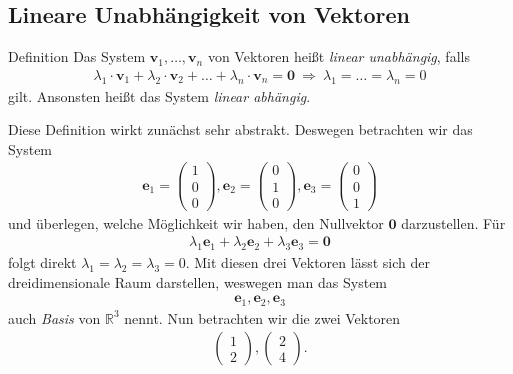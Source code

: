 \subsection{Lineare Unabhängigkeit von Vektoren}

\begin{mybox}{Definition}
Das System $\textbf{v}_1, \dots, \textbf{v}_n$ von Vektoren heißt \textit{linear unabhängig}, falls
\begin{align*}
\lambda_1 \cdot  \textbf{v}_1 + \lambda_2 \cdot \textbf{v}_2 + \dots + \lambda_n \cdot \textbf{v}_n = \textbf{0}
\ \Rightarrow \
\lambda_1 = \dots = \lambda_n = 0
\end{align*}
gilt.
Ansonsten heißt das System \textit{linear abhängig}.
\end{mybox}
Diese Definition wirkt zunächst sehr abstrakt.
Deswegen betrachten wir das System
\begin{align*}
\textbf{e}_1 =
\begin{pmatrix}
1\\ 0 \\0
\end{pmatrix},
\textbf{e}_2 =
\begin{pmatrix}
0  \\ 1 \\ 0
\end{pmatrix},
\textbf{e}_3 = 
\begin{pmatrix}
0 \\ 0 \\ 1
\end{pmatrix}
\end{align*}
und überlegen, welche Möglichkeit wir haben, den Nullvektor $\textbf{0}$ darzustellen.
Für
\begin{align*}
\lambda_1 \textbf{e}_1 + \lambda_2 \textbf{e}_2 + \lambda_3 \textbf{e}_3 = \textbf{0}
\end{align*}
folgt direkt $\lambda_1 = \lambda_2 = \lambda_3 = 0$.
Mit diesen drei Vektoren lässt sich der dreidimensionale Raum darstellen, weswegen man das System
\begin{align*}
\textbf{e}_1, \textbf{e}_2, \textbf{e}_3
\end{align*}
auch \textit{Basis} von $\mathbb{R}^3$ nennt.
Nun betrachten wir die zwei Vektoren
\begin{align*}
\begin{pmatrix}
1 \\2
\end{pmatrix},
\begin{pmatrix}
2 \\ 4
\end{pmatrix}.
\end{align*}

